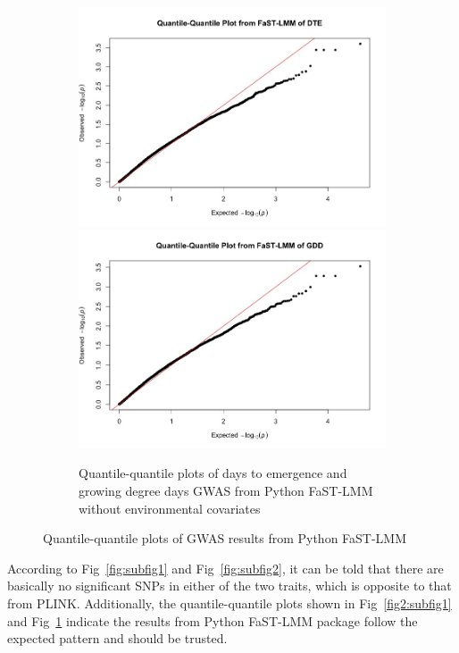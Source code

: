 \documentclass{article}
\begin{document}
\begin{figure}[!htb]
	\begin{subfigure}{\textwidth}
	\centering
		\includegraphics[scale=.25]{qqplot_fastlmm_dte.jpeg}
		\includegraphics[scale=.25]{qqplot_fastlmm_gdd.jpeg}
		\caption{Quantile-quantile plots of days to emergence and growing degree days GWAS from Python FaST-LMM without environmental covariates}
		\label{fig2:subfig2}
	\end{subfigure}
\caption{Quantile-quantile plots of GWAS results from Python FaST-LMM}
\label{fig2:qqplot}
\end{figure}

According to Fig~\ref{fig:subfig1} and Fig~\ref{fig:subfig2}, it can be told that there are basically no significant SNPs in either of the two traits, which is opposite to that from PLINK. Additionally, the quantile-quantile plots shown in Fig~\ref{fig2:subfig1} and Fig~\ref{fig2:subfig2} indicate the results from Python FaST-LMM package follow the expected pattern and should be trusted. 
\end{document}
